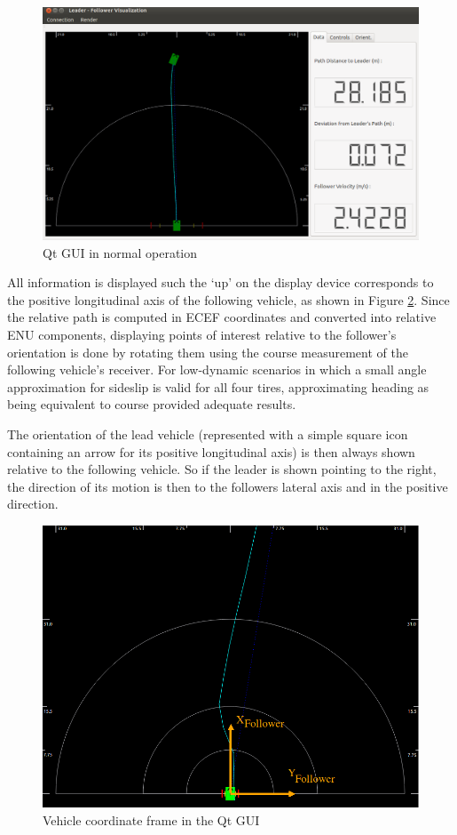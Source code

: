 \documentclass[twocolumn,10pt]{article}
\begin{document}
    \begin{figure}[ht] \centering
      \includegraphics[width=\columnwidth] {../graphics/final_design_data.png}
      \caption{Qt GUI in normal operation}
      \label{fig:qt_normal}
    \end{figure}

    All information is displayed such the `up' on the display device corresponds to the positive longitudinal axis of the following vehicle, as shown in Figure \ref{fig:mono_coord_sys}.
    Since the relative path is computed in ECEF coordinates and converted into relative ENU components, displaying points of interest relative to the follower's orientation is done by rotating them using the course measurement of the following vehicle's receiver. For low-dynamic scenarios in which a small angle approximation for sideslip is valid for all four tires, approximating heading as being equivalent to course provided adequate results.

    The orientation of the lead vehicle (represented with a simple square icon containing an arrow for its positive longitudinal axis) is then always shown relative to the following vehicle.  So if the leader is shown pointing to the right, the direction of its motion is then to the followers lateral axis and in the positive direction. 

    \begin{figure}[ht] \centering
      \includegraphics[width=0.7\columnwidth] {../graphics/mono_coord_sys.png}
      \caption{Vehicle coordinate frame in the Qt GUI}
      \label{fig:mono_coord_sys}
    \end{figure}
\end{document}
